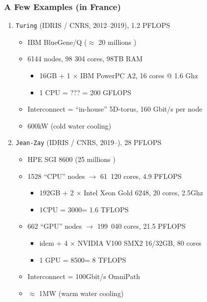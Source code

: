 \documentclass[xcolor={x11names,svgnames,psnames}]{beamer}
\newcommand{\euro}{\EUR\xspace}
\begin{document}
\begin{frame}
  \frametitle{A Few Examples (in France)}

  \begin{enumerate}
  \item \texttt{Turing} (IDRIS / CNRS, 2012--2019), 1.2 PFLOPS
    \begin{itemize}
    \item IBM BlueGene/Q ($\approx$ 20 millions \euro)
    \item 6144 nodes, 98 304 cores, 98TB RAM
      \begin{itemize}
      \item 16GB + 1 $\times$ IBM PowerPC A2, 16 cores @ 1.6 Ghz
      \item 1 CPU = ??? \euro = 200 GFLOPS
      \end{itemize}
    \item Interconnect = ``in-house'' 5D-torus, 160 Gbit/s per node
    \item 600kW (cold water cooling)
    \end{itemize}

    \medskip\pause

  \item<2-> \texttt{Jean-Zay} (IDRIS / CNRS, 2019--), 28 PFLOPS
    \begin{itemize}
    \item HPE SGI 8600 (25 millions \euro)
    \item 1528 ``CPU'' nodes $\rightarrow$ 61~120 cores, 4.9 PFLOPS
      \begin{itemize}
        \item 192GB + 2 $\times$ Intel Xeon Gold 6248, 20 cores, 2.5Ghz
        \item 1CPU = 3000\euro = 1.6 TFLOPS
        \end{itemize}
    \item<3-> 662 ``GPU'' nodes  $\rightarrow$ 199~040 cores, 21.5 PFLOPS
      \begin{itemize}
      \item idem + 4 $\times$ NVIDIA V100 SMX2 16/32GB, 80 cores
      \item 1 GPU = 8500\euro = 8 TFLOPS
      \end{itemize}
    \item Interconnect = 100Gbit/s OmniPath 
    \item $\approx$ 1MW (warm water cooling)
    \end{itemize}
  \end{enumerate}
\end{frame}
\end{document}
